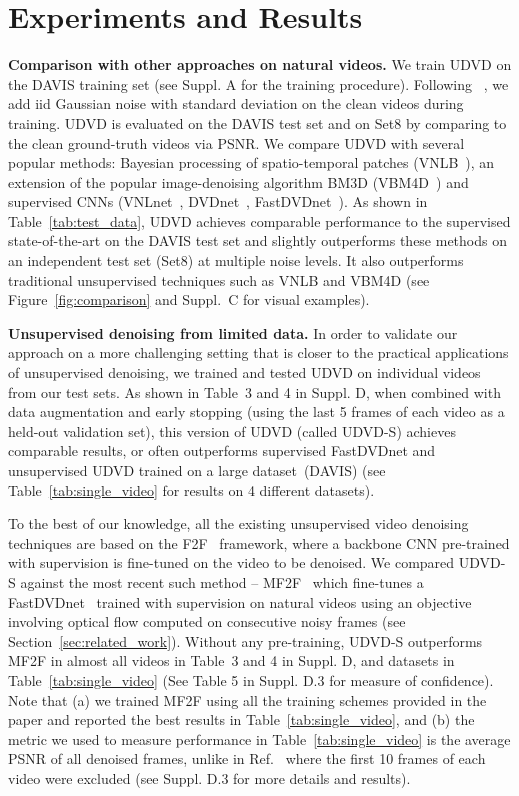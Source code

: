 \documentclass[final]{cvpr}
\begin{document}
\section{Experiments and Results}
\label{sec:results}

\noindent\textbf{Comparison with other approaches on natural videos.} We train UDVD on the DAVIS training set (see Suppl. A for the training procedure). Following ~\cite{dncnn, biasfree, fastdvdnet, dvdnet,  blindspotnet, n2v, noise2self}, we add iid Gaussian noise with standard deviation  on the clean videos during training. UDVD is evaluated on the DAVIS test set and on Set8 by comparing to the clean ground-truth videos via PSNR. We compare UDVD with several popular methods: Bayesian processing of spatio-temporal patches (VNLB~\cite{nlb}), an extension of the popular image-denoising algorithm BM3D (VBM4D~\cite{vbm4d}) and supervised CNNs (VNLnet~\cite{vnlnet}, DVDnet~\cite{dvdnet}, FastDVDnet~\cite{fastdvdnet}). As shown in Table~\ref{tab:test_data}, UDVD achieves comparable performance to the supervised state-of-the-art on the DAVIS test set and slightly outperforms these methods on an independent test set (Set8) at multiple noise levels. It also outperforms traditional unsupervised techniques such as VNLB and VBM4D (see Figure~\ref{fig:comparison} and  Suppl.~C for visual examples). 

\noindent\textbf{Unsupervised denoising from limited data.} In order to validate our approach on a more challenging setting that is closer to the practical applications of unsupervised denoising, we trained and tested UDVD on individual videos from our test sets. As shown in Table~3 and 4 in Suppl. D, when combined with data augmentation and early stopping (using the last 5 frames of each video as a held-out validation set), this version of UDVD (called UDVD-S) achieves comparable results, or often outperforms supervised FastDVDnet and unsupervised UDVD trained on a large dataset~(DAVIS) (see Table~\ref{tab:single_video} for results on 4 different datasets).

To the best of our knowledge, all the existing unsupervised video denoising techniques are based on the F2F~\cite{f2f} framework, where a backbone CNN pre-trained with supervision is fine-tuned on the video to be denoised. We compared UDVD-S against the most recent such method -- MF2F~\cite{mf2f} which fine-tunes a FastDVDnet~\cite{fastdvdnet} trained with supervision on natural videos using an objective involving optical flow computed on consecutive noisy frames (see Section~\ref{sec:related_work}). Without any pre-training, UDVD-S outperforms MF2F in almost all videos in  Table~3 and 4 in Suppl. D, and datasets in Table~\ref{tab:single_video} (See Table 5 in Suppl. D.3 for measure of confidence). 
Note that (a) we trained MF2F using all the  training schemes provided in the paper and reported the best results in Table~\ref{tab:single_video}, and (b) the metric we used to measure performance in  Table~\ref{tab:single_video} is the average PSNR of all denoised frames, unlike in Ref.~\cite{mf2f} where the first 10 frames of each video were excluded (see Suppl. D.3 for more details and results). 
\end{document}
